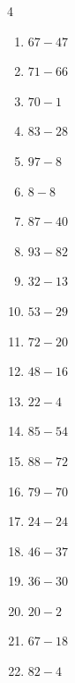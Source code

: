 \begin{multicols}{4}
\begin{enumerate}
  \item $67-47$
        \phantom{$=20$}

  \item $71-66$
        \phantom{$=5$}

  \item $70-1$
        \phantom{$=69$}

  \item $83-28$
        \phantom{$=55$}

  \item $97-8$
        \phantom{$=89$}

  \item $8-8$
        \phantom{$=0$}

  \item $87-40$
        \phantom{$=47$}

  \item $93-82$
        \phantom{$=11$}

  \item $32-13$
        \phantom{$=19$}

  \item $53-29$
        \phantom{$=24$}

  \item $72-20$
        \phantom{$=52$}

  \item $48-16$
        \phantom{$=32$}

  \item $22-4$
        \phantom{$=18$}

  \item $85-54$
        \phantom{$=31$}

  \item $88-72$
        \phantom{$=16$}

  \item $79-70$
        \phantom{$=9$}

  \item $24-24$
        \phantom{$=0$}

  \item $46-37$
        \phantom{$=9$}

  \item $36-30$
        \phantom{$=6$}

  \item $20-2$
        \phantom{$=18$}

  \item $67-18$
        \phantom{$=49$}

  \item $82-4$
        \phantom{$=78$}


\end{enumerate}
\end{multicols}
